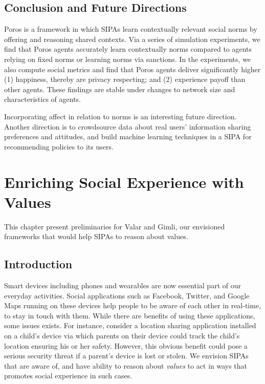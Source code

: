 \documentclass[11pt,          %
               phd,           %
               onehalfspacing %
               ]{ncsuthesis}
\newcommand{\fsl}{\textsl}
\newcommand{\frameworkB}{Poros\xspace}
\newcommand{\frameworkC}{Valar\xspace}
\newcommand{\frameworkD}{Gimli\xspace}
\begin{document}
\section{Conclusion and Future Directions}
\label{sec:precious-discussion}

\frameworkB is a framework in which SIPAs learn contextually relevant
social norms by offering and reasoning shared contexts. Via a series of
simulation experiments, we find that \frameworkB agents accurately learn
contextually norms compared to agents relying on fixed norms or learning
norms via sanctions. In the experiments, we also compute social metrics
and find that \frameworkB agents deliver significantly higher (1)
happiness, thereby are privacy respecting; and (2) experience payoff than
other agents. These findings are stable under changes to network size
and characteristics of agents.

Incorporating affect in relation to norms
\citep{Ferreira-AAAI13-GroupRelations} is an interesting future
direction. Another direction is to crowdsource data about real users'
information sharing preferences and attitudes, and build machine
learning techniques in a SIPA for recommending policies to its users.

\chapter{Enriching Social Experience with Values}
\label{chap:valar}

This chapter present preliminaries for \frameworkC and \frameworkD, our
envisioned frameworks that would help SIPAs to reason about values.

\section{Introduction}
\label{sec:valar-intro}

Smart devices including phones and wearables are now essential part of
our everyday activities. Social applications such as Facebook, Twitter,
and Google Maps running on these devices help people to be aware of each
other in real-time, to stay in touch with them. While there are benefits
of using these applications, some issues exists. For instance, consider
a location sharing application installed on a child's device via which
parents on their device could track the child's location ensuring his or
her safety. However, this obvious benefit could pose a serious security
threat if a parent's device is lost or stolen. We envision SIPAs that
are aware of, and have ability to reason about \fsl{values} to act in
ways that promotes social experience in such cases.
\end{document}

